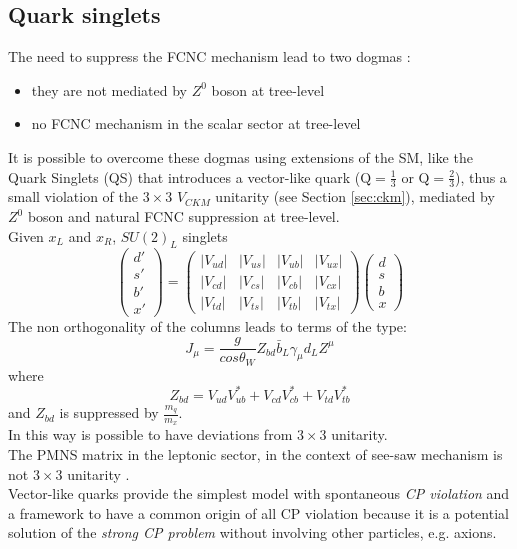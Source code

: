\subsection{Quark singlets}
The need to suppress the FCNC mechanism lead to two dogmas \cite{glash_fcnc,pashos}:
\begin{itemize}
	\item they are not mediated by $Z^0$ boson at tree-level
	\item no FCNC mechanism in the scalar sector at tree-level 
\end{itemize}
It is possible to overcome these dogmas using extensions of the SM, like the Quark Singlets (QS) \cite{barger} that introduces a vector-like quark ($\mathrm{Q=\frac{1}{3}}$ or $\mathrm{Q=\frac{2}{3}}$), thus a small violation of the $\mathrm{3 \times 3}$ $V_{CKM}$ unitarity (see Section \ref{sec:ckm}), mediated by $Z^0$ boson and natural 
FCNC suppression at tree-level.
\vspace{\baselineskip}
\\Given $x_L$ and $x_R$, $SU(2)_{L}$ singlets
\begin{equation}
\begin{pmatrix}
d' \\ 
s' \\ 
b' \\
x' 
\end{pmatrix} 
=
\begin{pmatrix}
|V_{ud}| & |V_{us}| & |V_{ub}|  & |V_{ux}| \\ 
|V_{cd}| & |V_{cs}| & |V_{cb}|   & |V_{cx}| \\ 
|V_{td}| & |V_{ts}|  &| V_{tb}|   & |V_{tx}|
\end{pmatrix} 
\begin{pmatrix}
d \\ 
s \\ 
b \\
x
\end{pmatrix} 
\end{equation}
The non orthogonality of the columns leads to terms of the type:
\begin{equation}
J_{\mu}= \frac{g}{cos\theta_W}Z_{bd}\bar{b}_{L}\gamma_{\mu}d_{L}Z^{\mu}
\end{equation}
where
\begin{equation}
Z_{bd}=V_{ud}V^*_{ub}+V_{cd}V^*_{cb}+V_{td}V^*_{tb}
\end{equation}
and $Z_{bd}$ is suppressed by $\frac{m_q}{m_x}$.
\vspace{\baselineskip}
\\In this way is possible to have deviations from $\mathrm{3 \times 3}$ unitarity.\\
The PMNS matrix in the leptonic sector, in the context of see-saw mechanism is not  $\mathrm{3 \times 3}$ unitarity \cite{pnms}.
\\Vector-like quarks provide the simplest model with spontaneous \textit{CP violation} and a framework to have a common origin
of all CP violation because it is a potential solution of the \textit{strong CP problem} without involving other particles, e.g. axions.

